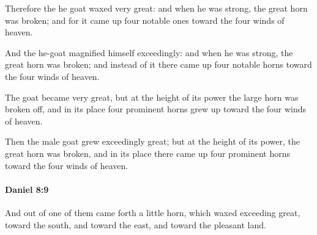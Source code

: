 			Therefore the he goat waxed very great: and when he was strong, the great horn was broken; and for it came up four notable ones toward the four winds of heaven.

			\begin{versebox}
					\item[BHS] 
					\item[LXX] 
					\item[ASV] And the he-goat magnified himself exceedingly: and when he was strong, the great horn was broken; and instead of it there came up four notable horns toward the four winds of heaven.
					\item[NIV] The goat became very great, but at the height of its power the large horn was broken off, and in its place four prominent horns grew up toward the four winds of heaven.
					\item[NRSV] Then the male goat grew exceedingly great; but at the height of its power, the great horn was broken, and in its place there came up four prominent horns toward the four winds of heaven.
			\end{versebox}

		\paragraph{Daniel 8:9} %
			\label{DANIEL-8-9}

			And out of one of them came forth a little horn, which waxed exceeding great, toward the south, and toward the east, and toward the pleasant land.

